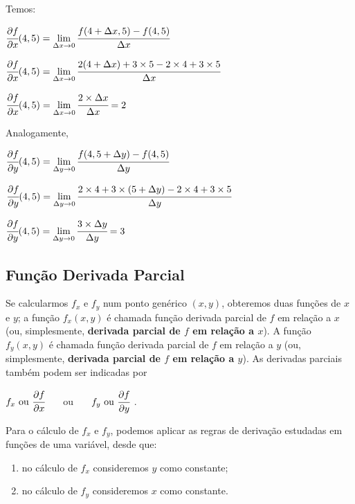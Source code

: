 		\medskip

		Temos:

		\medskip

		$\cfrac{\partial f}{\partial x} (4, 5) = \lim \limits_{\Delta x \to 0} \cfrac{f(4 + \Delta x, 5) - f(4, 5)}{\Delta x}$

		$\cfrac{\partial f}{\partial x} (4, 5) = \lim \limits_{\Delta x \to 0} \cfrac{2(4 + \Delta x) + 3 \times 5 - 2 \times 4 + 3 \times 5}{\Delta x}$

		$\cfrac{\partial f}{\partial x} (4, 5) = \lim \limits_{\Delta x \to 0} \cfrac{2 \times \Delta x}{\Delta x} = 2$
		
		\medskip

		Analogamente,

		\medskip

		$\cfrac{\partial f}{\partial y} (4, 5) = \lim \limits_{\Delta y \to 0} \cfrac{f(4, 5 + \Delta y) - f(4, 5)}{\Delta y}$

		$\cfrac{\partial f}{\partial y} (4, 5) = \lim \limits_{\Delta y \to 0} \cfrac{2 \times 4 + 3 \times (5 + \Delta y) - 2 \times 4 + 3 \times 5}{\Delta y}$

		$\cfrac{\partial f}{\partial y} (4, 5) = \lim \limits_{\Delta y \to 0} \cfrac{3 \times \Delta y}{\Delta y} = 3$	
		
	\subsection{Função Derivada Parcial \cite{morettin}}

		Se calcularmos $f_{x}$ e $f_{y}$ num ponto genérico $(x, y)$, obteremos duas funções de $x$ e $y$; a função $f_{x}(x, y)$ é chamada função derivada parcial de $f$ em relação a $x$ (ou, simplesmente, \textbf{derivada parcial de $f$ em relação a $x$}). A função $f_{y}(x, y)$ é chamada função derivada parcial de $f$ em relação a $y$ (ou, simplesmente, \textbf{derivada parcial de $f$ em relação a $y$}). As derivadas parciais também podem ser indicadas por

		\bigskip

		{\LARGE $f_{x} \ \text{ou} \ \cfrac{\partial f}{\partial x}$ \ \ \ ou \ \ \ $f_{y} \ \text{ou} \ \cfrac{\partial f}{\partial y}$} .
		
		\bigskip

		Para o cálculo de $f_{x}$ e $f_{y}$, podemos aplicar as regras de derivação estudadas em funções de uma variável, desde que:

		\begin{enumerate}[label=(\alph*)]

			\item no cálculo de $f_{x}$ consideremos $y$ como constante;
			\item no cálculo de $f_{y}$ consideremos $x$ como constante.

		\end{enumerate}
		
